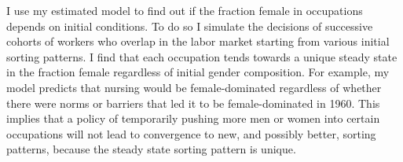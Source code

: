 \documentclass[12pt]{article}
\begin{document}




I use my estimated model to find out if the fraction female in occupations depends on initial conditions. To do so I simulate the decisions of successive cohorts of workers who overlap in the labor market starting from various initial sorting patterns. I find that each occupation tends towards a unique steady state in the fraction female regardless of initial gender composition. For example, my model predicts that nursing would be female-dominated regardless of whether there were norms or barriers that led it to be female-dominated in 1960. This implies that a policy of temporarily pushing more men or women into certain occupations will not lead to convergence to new, and possibly better, sorting patterns, because the steady state sorting pattern is unique.
\end{document}
